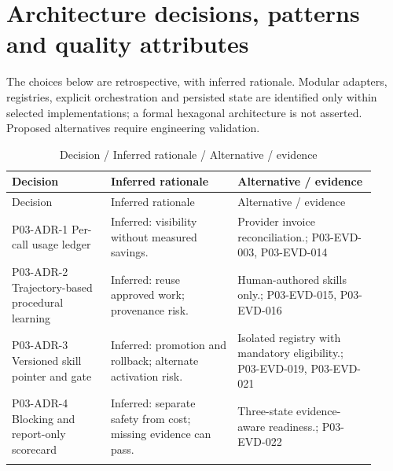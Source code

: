 \documentclass[10pt,letterpaper]{article}
\begin{document}
\section{Architecture decisions, patterns and quality attributes}
The choices below are retrospective, with inferred rationale. Modular adapters, registries, explicit orchestration and persisted state are identified only within selected implementations; a formal hexagonal architecture is not asserted. Proposed alternatives require engineering validation.
\begin{longtable}{@{}>{\raggedright\arraybackslash}p{0.25\linewidth}>{\raggedright\arraybackslash}p{0.32\linewidth}>{\raggedright\arraybackslash}p{0.35\linewidth}@{}}
\caption{Decision / Inferred rationale / Alternative / evidence}\\
\toprule Decision & Inferred rationale & Alternative / evidence\\\midrule\endfirsthead
\toprule Decision & Inferred rationale & Alternative / evidence\\\midrule\endhead
P03-ADR-1 Per-call usage ledger & Inferred: visibility without measured savings. & Provider invoice reconciliation.; P03-EVD-003, P03-EVD-014\\\addlinespace
P03-ADR-2 Trajectory-based procedural learning & Inferred: reuse approved work; provenance risk. & Human-authored skills only.; P03-EVD-015, P03-EVD-016\\\addlinespace
P03-ADR-3 Versioned skill pointer and gate & Inferred: promotion and rollback; alternate activation risk. & Isolated registry with mandatory eligibility.; P03-EVD-019, P03-EVD-021\\\addlinespace
P03-ADR-4 Blocking and report-only scorecard & Inferred: separate safety from cost; missing evidence can pass. & Three-state evidence-aware readiness.; P03-EVD-022\\\addlinespace
\bottomrule\end{longtable}
\end{document}
